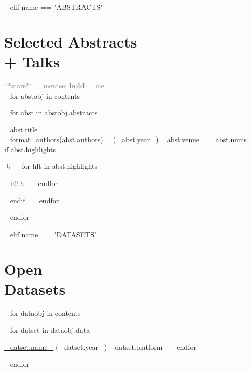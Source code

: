 ~{ elif name == "ABSTRACTS" }~

\section{Selected Abstracts\\+ Talks}
\textcolor{grey}{**stars** = mentee; \textbf{bold} = me}\\

~{ for abstobj in contents }~ 
\begin{etaremune}[itemindent=-1.5\bibhang, topsep=0pt,
				   itemsep=\bibsep,partopsep=0pt,parsep=0pt,leftmargin={\bibhang+\widthof{[999]}}] 
    ~{ for abst in abstobj.abstracts  }~
    \item ~{{ abst.title }}~\\ ~{{ format_authors(abst.authors) }}~. (~{{ abst.year }}~) ~{{ abst.venue }}~. ~{{ abst.nums }}~
     ~{ if abst.highlights }~
     	\begin{list}{$\drsh$}{}
     	~{ for hlt in abst.highlights }~
	     \item  \textcolor{grey}{\textit{~{{ hlt.h }}~} }
     	~{ endfor }~
     	\end{list}
     ~{ endif }~
	~{ endfor }~


\end{etaremune}
~{ endfor }~



~{ elif name == "DATASETS" }~

\section{Open\\Datasets}

~{ for dataobj in contents }~ 
\begin{etaremune}[itemindent=-1.5\bibhang, topsep=0pt,
                   itemsep=\bibsep,partopsep=0pt,parsep=0pt,leftmargin={\bibhang+\widthof{[999]}}] 
    ~{ for datset in dataobj.data  }~
    \item \href{~{{ datset.link }}~}{~{{ datset.name }}~} (~{{ datset.year }}~) ~{{ datset.platform }}~
    ~{ endfor }~

\end{etaremune}
~{ endfor }~




